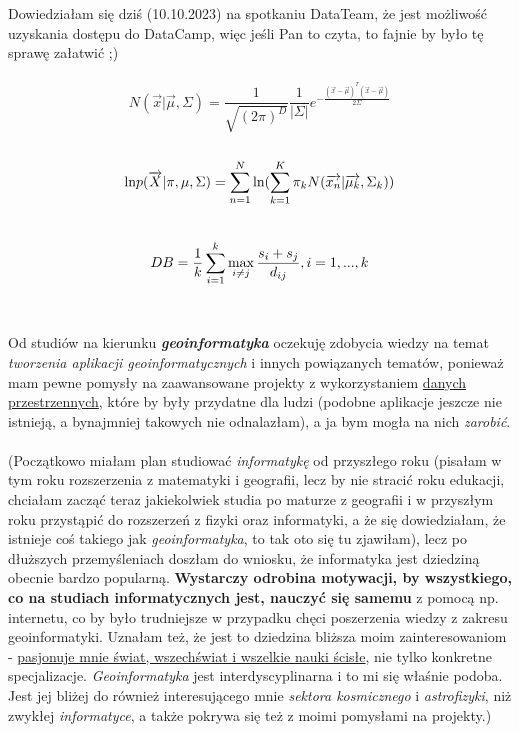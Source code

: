 \documentclass{article}
\author{Zuzanna Dybcio}
\date{October 2023}
\begin{document}
Dowiedziałam się dziś (10.10.2023) na spotkaniu DataTeam, że jest możliwość uzyskania dostępu do DataCamp, więc jeśli Pan to czyta, to fajnie by było tę sprawę załatwić ;)
\\\\
\begin{equation}
    N(\overrightarrow{x} | \overrightarrow{\mu}, \Sigma) = \frac{1}{\sqrt{(2\pi)^{D}}} \frac{1}{|\Sigma|} e^{-\frac{(\overrightarrow{x}-\overrightarrow{\mu})^T (\overrightarrow{x}-\overrightarrow{\mu})}{2\Sigma}}
\end{equation}
\\
\begin{equation}
    \text{ln} \space p \space (\overrightarrow{X} | \pi, \mu, \Sigma) \space = \sum_{n=1}^{N} \space \text{ln} \space (\sum_{k=1}^{K} \mathrm \pi_k N \space (\overrightarrow{x_n} | \overrightarrow{\mu_k},\Sigma_k))
\end{equation}
\\
\begin{equation}
    DB = \frac{1}{k} \sum_{i=1}^{k} \space \max_{i \neq j} \space \frac{s_{i} + s_{j}}{d_{ij}}, \space i=1,...,k
\end{equation}
\\\\
Od studiów na kierunku \textbf{\emph{geoinformatyka}} oczekuję zdobycia wiedzy na temat \emph{tworzenia aplikacji geoinformatycznych} i innych powiązanych tematów, ponieważ mam pewne pomysły na zaawansowane projekty z wykorzystaniem \underline{danych przestrzennych}, które by były przydatne dla ludzi (podobne aplikacje jeszcze nie istnieją, a bynajmniej takowych nie odnalazłam), a ja bym mogła na nich \emph{zarobić}. 
\\\\
(Początkowo miałam plan studiować \emph{informatykę} od przyszłego roku (pisałam w tym roku rozszerzenia z matematyki i geografii, lecz by nie stracić roku edukacji, chciałam zacząć teraz jakiekolwiek studia po maturze z geografii i w przyszłym roku przystąpić do rozszerzeń z fizyki oraz informatyki, a że się dowiedziałam, że istnieje coś takiego jak \emph{geoinformatyka}, to tak oto się tu zjawiłam), lecz po dłuższych przemyśleniach doszłam do wniosku, że informatyka jest dziedziną obecnie bardzo popularną. \textbf{Wystarczy odrobina motywacji, by wszystkiego, co na studiach informatycznych jest, nauczyć się samemu} z pomocą np. internetu, co by było trudniejsze w przypadku chęci poszerzenia wiedzy z zakresu geoinformatyki. Uznałam też, że jest to dziedzina bliższa moim zainteresowaniom - \underline{pasjonuje mnie świat, wszechświat i wszelkie nauki ścisłe}, nie tylko konkretne specjalizacje. \emph{Geoinformatyka} jest interdyscyplinarna i to mi się właśnie podoba. Jest jej bliżej do również interesującego mnie \emph{sektora kosmicznego} i \emph{astrofizyki}, niż zwykłej \emph{informatyce}, a także pokrywa się też z moimi pomysłami na projekty.)
\end{document}
